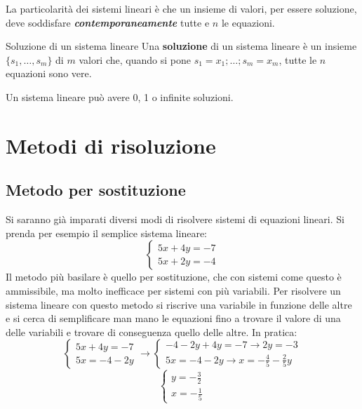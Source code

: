 La particolarità dei sistemi lineari è che un insieme di valori, per essere soluzione, deve soddisfare \textbf{\textit{contemporaneamente}} tutte e $n$ le equazioni.

\begin{newdef}{Soluzione di un sistema lineare}
    Una \textbf{soluzione} di un sistema lineare è un insieme $\{s_1, \dots, s_m\}$ di $m$ valori che, quando si pone $s_1 = x_1; \dots; s_m = x_m$, tutte le $n$ equazioni sono vere.

    Un sistema lineare può avere 0, 1 o infinite soluzioni.
\end{newdef}

\section{Metodi di risoluzione}
\subsection{Metodo per sostituzione}
Si saranno già imparati diversi modi di risolvere sistemi di equazioni lineari. Si prenda per esempio il semplice sistema lineare:
\[
    \begin{cases}
        5x + 4y = -7 \\
        5x + 2y = -4
    \end{cases}
\]
Il metodo più basilare è quello per sostituzione, che con sistemi come questo è ammissibile, ma molto inefficace per sistemi con più variabili. Per risolvere un sistema lineare con questo metodo si riscrive una variabile in funzione delle altre e si cerca di semplificare man mano le equazioni fino a trovare il valore di una delle variabili e trovare di conseguenza quello delle altre. In pratica:
\[
    \begin{cases}
        5x + 4y = -7 \\
        5x = -4 - 2y
    \end{cases}
    \rightarrow
    \begin{cases}
        -4 - 2y + 4y = -7 \rightarrow 2y = -3\\
        5x = -4 - 2y \rightarrow x = -\frac{4}{5} - \frac{2}{5}y
    \end{cases}
\]
\[
    \begin{cases}
        y = -\frac{3}{2} \\
        x = -\frac{1}{5}
    \end{cases}
\]

